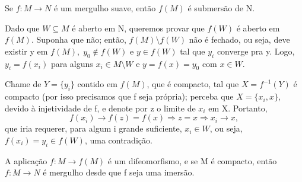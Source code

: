 \documentclass[../differential_topology.tex]{subfiles}
\begin{document}
\begin{theorem*}
	Se \(f:M\rightarrow N\) é um mergulho suave, então \(f(M)\) é submersão de N.
\end{theorem*}
\begin{proof*}
	Dado que \(W\subseteq M\) é aberto em N, queremos provar que \(f(W)\) é aberto em \(f(M)\).
	Suponha que não; então, \(f(M)\setminus{f(W)}\) não é fechado, ou seja, deve existir y em \(f(M),\; y_{0}\not\in f(W)\) e \(y\in f(W)\) tal que \(y_{i}\) converge pra y.
	Logo, \(y_{i}=f(x_{i})\) para alguns \(x_{i}\in M\setminus{W}\) e \(y=f(x)=y_{0}\) com \(x\in W.\)

	Chame de \(Y=\{y_{i}\}\) contido em \(f(M)\), que é compacto, tal que \(X = f^{-1}(Y)\) é compacto (por isso precisamos que f seja própria); perceba que \(X=\{x_{i}, x\}\), devido à injetividade de f, e denote por z o limite de \(x_{i}\) em X. Portanto,
	\[
		f(x_{i})\rightarrow f(z)=f(x) \Rightarrow z=x \Rightarrow x_{i}\rightarrow x,
	\]
	que iria requerer, para algum i grande suficiente, \(x_{i}\in W\), ou seja, \(f(x_{i}) = y_{i}\in f(W)\), uma contradição. \qedsymbol
\end{proof*}
\begin{tcolorbox}[
		skin=enhanced,
		title=Observação,
		fonttitle=\bfseries,
		colframe=black,
		colbacktitle=cyan!75!white,
		colback=cyan!15,
		colbacklower=black,
		coltitle=black,
		drop fuzzy shadow,
	]
	A aplicação \(f:M\rightarrow f(M)\) é um difeomorfismo, e se M é compacto, então \(f:M\rightarrow N\) é mergulho desde que f seja uma imersão.
\end{tcolorbox}
\end{document}
